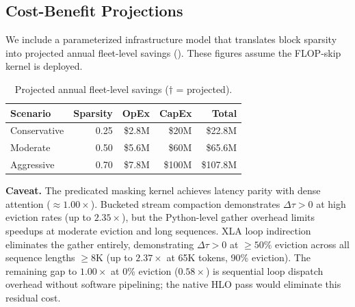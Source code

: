 \documentclass[conference,10pt]{IEEEtran}
\begin{document}
\subsection{Cost-Benefit Projections}

We include a parameterized infrastructure model that translates block sparsity
into projected annual fleet-level savings (). These figures
assume the FLOP-skip kernel is deployed.

\begin{table}[t]
    \centering
    \caption{Projected annual fleet-level savings ($\dagger$ = projected).}
    \label{tab:cost}
    \begin{tabular}{@{}lrrrr@{}}
        \toprule
        \textbf{Scenario} & \textbf{Sparsity} & \textbf{OpEx} & \textbf{CapEx} & \textbf{Total} \\
        \midrule
        Conservative & 0.25 & \$2.8M & \$20M  & \$22.8M  \\
        Moderate     & 0.50 & \$5.6M & \$60M  & \$65.6M  \\
        Aggressive   & 0.70 & \$7.8M & \$100M & \$107.8M \\
        \bottomrule
    \end{tabular}
\end{table}

\noindent\textbf{Caveat.} The predicated masking kernel achieves latency
parity with dense attention ($\approx 1.00\times$). Bucketed stream
compaction demonstrates $\Delta\tau > 0$ at high eviction rates
(up to $2.35\times$), but the Python-level gather overhead limits
speedups at moderate eviction and long sequences. XLA loop indirection
eliminates the gather entirely, demonstrating $\Delta\tau > 0$ at
$\geq 50\%$ eviction across all sequence lengths $\geq 8$K
(up to $2.37\times$ at 65K tokens, 90\% eviction). The remaining
gap to $1.00\times$ at 0\% eviction ($0.58\times$) is sequential
loop dispatch overhead without software pipelining; the native HLO
pass would eliminate this residual cost.
\end{document}
